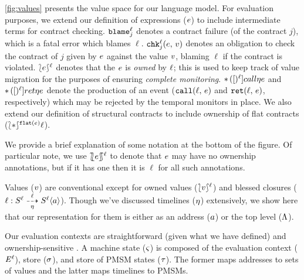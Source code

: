 \documentclass[preprint,onecolumn,9pt]{sigplanconf} %
\begin{document}
%
\autoref{fig:values} presents the value space for our language model.
%
For evaluation purposes, we extend our definition of expressions ($e$) to include intermediate terms for contract checking.
%
${\tt blame}^{\ell}_{j}$ denotes a contract failure (of the contract $j$), which is a fatal error which blames $\ell$.
%
${\tt chk}{^{\ell}_{j}}({e,\, v})$ denotes an obligation to check the contract of $j$ given by $e$ against the value $v$, blaming $\ell$ if the contract is violated.
%
$\lbag e\rbag^{\ell}$ denotes that the $e$ is \emph{owned} \cite{ianjohnson:dthf:complete} by $\ell$; this is used to keep track of value migration for the purposes of ensuring \emph{complete monitoring}.
%
${\tt *}{\,}({[})^{\ell}]{call}{\eta}{e}$ and ${\tt *}{\,}({[})^{\ell}]{ret}{\eta}{e}$ denote the production of an event (${\tt call}(\ell,\, e)$ and ${\tt ret}(\ell,\, e)$, respectively) which may be rejected by the temporal monitors in place.
%
We also extend our definition of structural contracts to include ownership of flat contracts ($\sown*{\sflat{\mexp}}{\mmlab}$).

%
\NB We provide a brief explanation of some notation at the bottom of the figure.
Of particular note, we use $\sOwn{\mexp}{\mmlab}$ to denote that $e$ may have no ownership annotations, but if it has one then it is $\ell$ for all such annotations.
%

%
Values ($v$) are conventional except for owned values ($\lbag v\rbag^{\ell}$) and blessed closures ($\ell : S^{\ell} \overset{\ell}{\underset{\eta}{\dashrightarrow}} S^{\ell} \langle a\rangle$).
%
Though we've discussed timelines ($\eta$) extensively, we show here that our representation for them is either as an address ($a$) or the top level ($\Lambda$).
%

%
Our evaluation contexts are straightforward (given what we have defined) and ownership-sensitive \cite{ianjohnson:dthf:complete}.
%
A machine state ($\varsigma$) is composed of the evaluation context ($\mathit{E}^{\ell}$), store ($\sigma$), and store of PMSM states ($\tau$).
%
The former maps addresses to sets of values and the latter maps timelines to PMSMs.
%
\end{document}

